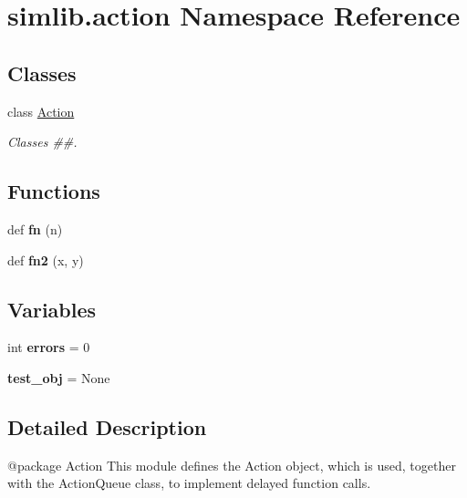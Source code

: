 \hypertarget{namespacesimlib_1_1action}{}\section{simlib.\+action Namespace Reference}
\label{namespacesimlib_1_1action}
\subsection*{Classes}
\begin{DoxyCompactItemize}
\item 
class \mbox{\hyperlink{classsimlib_1_1action_1_1_action}{Action}}
\begin{DoxyCompactList}\small\item\em Classes \#\#. \end{DoxyCompactList}\end{DoxyCompactItemize}
\subsection*{Functions}
\begin{DoxyCompactItemize}
\item 
\mbox{\label{namespacesimlib_1_1action_ab7fe3c0b13e6245919ae875f53e402a2}} 
def {\bfseries fn} (n)
\item 
\mbox{\label{namespacesimlib_1_1action_a04debf992e34c2c78decde32950215f8}} 
def {\bfseries fn2} (x, y)
\end{DoxyCompactItemize}
\subsection*{Variables}
\begin{DoxyCompactItemize}
\item 
\mbox{\label{namespacesimlib_1_1action_a7c9b53dfdf7b83201f3b579c0babbaa0}} 
int {\bfseries errors} = 0
\item 
\mbox{\label{namespacesimlib_1_1action_a0b9adc670ea622af1a4ac000c4551503}} 
{\bfseries test\+\_\+obj} = None
\end{DoxyCompactItemize}


\subsection{Detailed Description}
\begin{DoxyVerb}@package Action
This module defines the Action object, which is used, together with the ActionQueue class,
to implement delayed function calls.
\end{DoxyVerb}
 